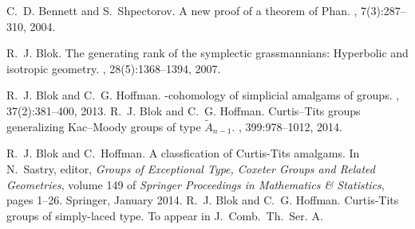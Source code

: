 \documentclass[12pt]{amsart}
\theoremstyle{definition}
\begin{document}

\begin{thebibliography}{10}

%
%

C.~D. Bennett and S.~Shpectorov.
\newblock A new proof of a theorem of {P}han.
, 7(3):287--310, 2004.

%
%
%
R.~J. Blok.
\newblock The generating rank of the symplectic grassmannians: Hyperbolic and
  isotropic geometry.
, 28(5):1368--1394, 2007.


R.~J. Blok and C.~G. Hoffman.
-cohomology of simplicial amalgams of groups.
, 37(2):381--400, 2013.
%
R.~J. Blok and C.~G. Hoffman.
\newblock Curtis--{T}its groups generalizing {K}ac--{M}oody groups of type
  {$\tilde{A}_{n-1}$}.
, 399:978--1012, 2014.

R.~J. Blok and C.~Hoffman.
\newblock A classfication of {C}urtis-{T}its amalgams.
\newblock In N.~Sastry, editor, {\em Groups of Exceptional Type, Coxeter Groups
  and Related Geometries}, volume 149 of {\em Springer Proceedings in
  Mathematics \& Statistics}, pages 1--26. Springer, January 2014.
%
R.~J. Blok and C.~G. Hoffman.
\newblock Curtis-Tits groups of simply-laced type.
\newblock To appear in J.~Comb.~Th.~Ser. A.
%
%
%


\end{thebibliography}
\end{document}
